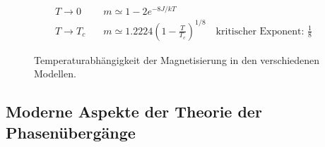 \begin{enumerate}[A)]
\begin{itemize}
\begin{equation}
\begin{split}
                T \to 0 \quad &m \simeq 1 - 2 e^{-8 J / k T} \\
                T \to T_c \quad &m \simeq 1.2224 (1- \frac{T}{T_c})^{1/8} \quad \text{kritischer Exponent: } \frac{1}{8}
            \end{split}
        \end{equation}
        \begin{figure}[H]
        \centering
        \def\svgwidth{0.5\textwidth}
        
        \caption{Temperaturabhängigkeit der Magnetisierung in den verschiedenen Modellen.}
        \label{img:m_T_Diag}
\end{figure}
    \end{itemize}
\end{enumerate}

\subsection{Moderne Aspekte der Theorie der Phasenübergänge}
